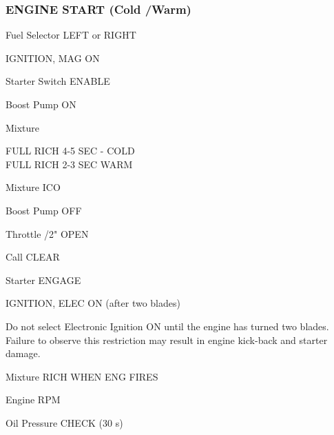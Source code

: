 \begin{multicols}{2}
\subsubsection*{ENGINE START (Cold /Warm)}
\begin{enumerate*}
\item Fuel Selector \dotfill LEFT or RIGHT
\item IGNITION, MAG \dotfill ON
\item Starter Switch \dotfill ENABLE
\item Boost Pump \dotfill ON
\item Mixture \raggedright \dotfill FULL RICH 4-5 SEC - COLD\\\dotfill FULL RICH 2-3 SEC WARM
\item Mixture \dotfill ICO
\item Boost Pump \dotfill OFF
\item Throttle /2"  OPEN
\item Call \dotfill CLEAR
\item Starter \dotfill ENGAGE
\item IGNITION, ELEC \dotfill ON (after two blades)
\begin{Note}[CAUTION]
Do not select Electronic Ignition ON until the engine
has turned two blades. Failure to observe this restriction may result
in engine kick-back and starter damage.
\end{Note}
\item Mixture \dotfill RICH WHEN ENG FIRES
\item Engine  RPM
\item Oil Pressure \dotfill CHECK (30 s)
\end{enumerate*}


\end{multicols}

